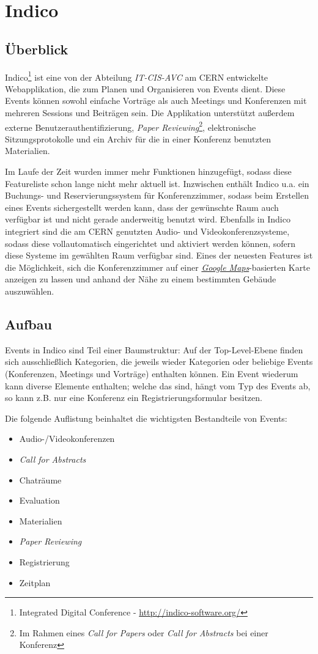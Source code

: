 \section{Indico}

\subsection{Überblick}
Indico\footnote{Integrated Digital Conference - \href{http://indico-software.org/}{http://indico-software.org/}}
ist eine von der Abteilung \emph{IT-CIS-AVC} am CERN entwickelte Webapplikation, die zum Planen und
Organisieren von Events dient. Diese Events können sowohl einfache Vorträge als auch Meetings und
Konferenzen mit mehreren Sessions und Beiträgen sein. Die Applikation unterstützt außerdem externe
Benutzerauthentifizierung, \emph{Paper Reviewing}\footnote{Im Rahmen eines \emph{Call for Papers}
oder \emph{Call for Abstracts} bei einer Konferenz}, elektronische Sitzungsprotokolle und ein Archiv
für die in einer Konferenz benutzten Materialien. \citep{indico}

Im Laufe der Zeit wurden immer mehr Funktionen hinzugefügt, sodass diese Featureliste schon lange
nicht mehr aktuell ist. Inzwischen enthält Indico u.a. ein Buchungs- und Reservierungssystem für
Konferenzzimmer, sodass beim Erstellen eines Events sichergestellt werden kann, dass der gewünschte
Raum auch verfügbar ist und nicht gerade anderweitig benutzt wird. Ebenfalls in Indico integriert
sind die am CERN genutzten Audio- und Videokonferenzsysteme, sodass diese vollautomatisch
eingerichtet und aktiviert werden können, sofern diese Systeme im gewählten Raum verfügbar sind.
Eines der neuesten Features ist die Möglichkeit, sich die Konferenzzimmer auf einer
\href{http://maps.google.com/}{\emph{Google Maps}}-basierten Karte anzeigen zu lassen und anhand der
Nähe zu einem bestimmten Gebäude auszuwählen.

\subsection{Aufbau}
Events in Indico sind Teil einer Baumstruktur: Auf der Top-Level-Ebene finden sich ausschließlich
Kategorien, die jeweils wieder Kategorien oder beliebige Events (Konferenzen, Meetings und
Vorträge) enthalten können. Ein Event wiederum kann diverse Elemente enthalten; welche das sind,
hängt vom Typ des Events ab, so kann z.B. nur eine Konferenz ein Registrierungsformular
besitzen.

\newpage
Die folgende Auflistung beinhaltet die wichtigsten Bestandteile von Events:
\begin{itemize}
\item Audio-/Videokonferenzen
\item \emph{Call for Abstracts}
\item Chaträume
\item Evaluation
\item Materialien
\item \emph{Paper Reviewing}
\item Registrierung
\item Zeitplan
\end{itemize}

